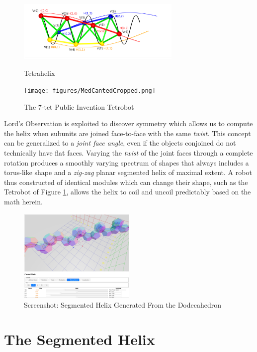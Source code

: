 \documentclass{svproc}
\begin{document}
\begin{figure}
  \centering
  \includegraphics[width=0.7\textwidth]{figures/UnifiedDrawing.png}
  \caption{Tetrahelix\label{fig:helixnodes}}
  \texttt{[image: figures/MedCantedCropped.png]}
  \caption{The 7-tet Public Invention Tetrobot\label{fig:tetrobot}}
\end{figure}

Lord's Observation is exploited to discover symmetry which allows us to compute the helix when subunits are joined face-to-face with
the same {\em twist.}
This concept can be generalized to a {\em joint face angle}, even if the
objects conjoined do not technically have flat faces.
Varying the {\em twist} of the joint faces through a complete rotation produces a smoothly varying
spectrum of shapes that always includes a torus-like shape and a
{\em zig-zag} planar segmented helix of maximal extent.
A robot thus constructed of identical modules which can change their shape, such as the Tetrobot of Figure \ref{fig:tetrobot}, allows the helix to coil and uncoil
predictably based on the math herein.

\begin{figure}
  \centering
  \includegraphics[width=0.5\textwidth]{figures/Dodecahedral.png}
 \caption{Screenshot: Segmented Helix Generated From the Dodecahedron}
  \label{fig:dodecahedron}
\end{figure}

\section{The Segmented Helix}
\end{document}
